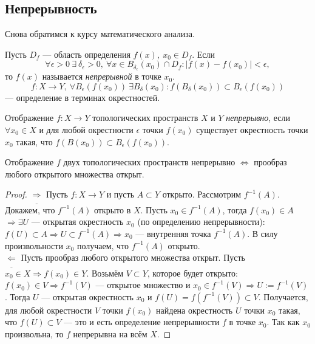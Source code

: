 \subsection{Непрерывность}
Снова обратимся к курсу математического анализа.
\begin{definition}
    Пусть $D_f$ — область определения $f(x),\ x_0\in D_f$. Если 
    \[\forall \epsilon>0\ \exists\ \delta_{\epsilon}>0,\ \forall x\in B_{\delta_{\epsilon}}(x_0)\cap D_f: |f(x)-f(x_0)|<\epsilon,\] 
    то $f(x)$ называется \textit{непрерывной} в точке $x_0$. \\
    $$f: X \to Y, \ \forall B_{\epsilon}(f(x_0)) \ \exists B_{\delta}(x_0): f(B_{\delta}(x_0)) \subset B_{\epsilon}(f(x_0))$$ — определение в терминах окрестностей.
\end{definition}

\begin{definition}
    Отображение $f: X \to Y$ топологических пространств $X$ и $Y$ \textit{непрерывно}, если $\forall x_0 \in X$ и для любой окрестности $\epsilon$ точки $f(x_0)$ существует окрестность точки $x_0$ такая, что $f(B(x_0)) \subset B_{\epsilon} (f(x_0))$.
\end{definition}

\begin{statement}
    Отображение $f$ двух топологических пространств непрерывно $\Longleftrightarrow$ прообраз любого открытого множества открыт.
\end{statement}
\begin{proof}
    $\underline{\Longrightarrow}$ Пусть $f: X \to Y$ и пусть $A \subset Y$ открыто. Рассмотрим $f^{-1}(A)$. Докажем, что $f^{-1}(A)$ открыто в $X$. Пусть $x_0 \in f^{-1}(A)$, тогда $f(x_0) \in A$ $\Longrightarrow \exists U$ — открытая окрестность $x_0$ (по определению непрерывности): $f(U) \subset A \Longrightarrow U \subset f^{-1}(A) \Longrightarrow x_0$ — внутренняя точка $f^{-1}(A)$. В силу произвольности $x_0$ получаем, что $f^{-1}(A)$ открыто. \\
    $\underline{\Longleftarrow}$ Пусть прообраз любого открытого множества открыт. Пусть $x_0 \in X \Longrightarrow f(x_0) \in Y$. Возьмём $V \subset Y$, которое будет открыто: $f(x_0) \in V \Longrightarrow f^{-1}(V)$ — открытое множество и $x_0 \in f^{-1}(V) \Longrightarrow U := f^{-1}(V)$. Тогда $U$  — открытая окрестность $x_0$ и $f(U) = f(f^{-1}(V)) \subset V$. Получается, для любой окрестности $V$ точки $f(x_0)$ найдена окрестность $U$ точки $x_0$ такая, что $f(U) \subset V$ — это и есть определение непрерывности $f$ в точке $x_0$. Так как $x_0$ произвольна, то $f$ непрерывна на всём $X$.
\end{proof}

